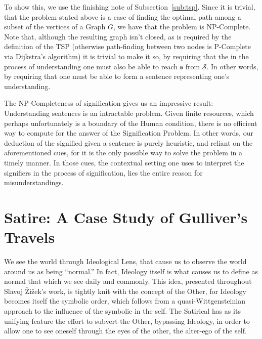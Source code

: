 \documentclass[11pt,letterpaper]{article}
\theoremstyle{definition}
\begin{document}
To show this, we use the finishing note of Subsection~\ref{sub:tsp}. Since it is trivial, that the problem stated above is a case of finding the optimal path among a subset of the vertices of a Graph \(G\), we have that the problem is NP-Complete.
Note that, although the resulting graph isn't closed, as is required by the definition of the TSP (otherwise path-finding between two nodes is P-Complete via Dijkstra's algorithm) it is trivial to make it so, by requiring that the in the process of understanding one must also be able to reach \(\mathfrak{s}\) from \(\mathscr{S}\). In other words, by requiring that one must be able to form a sentence representing one's understanding.

The NP-Completeness of signification gives us an impressive result: Understanding sentences is an intractable problem. Given finite resources, which perhaps unfortunately is a boundary of the Human condition, there is no efficient way to compute for the answer of the Signification Problem. In other words, our deduction of the signified given a sentence is purely heuristic, and reliant on the aforementioned cues, for it is the only possible way to solve the problem in a timely manner. In those cues, the contextual setting one uses to interpret the signifiers in the process of signification, lies the entire reason for misunderstandings.

\section{Satire: A Case Study of Gulliver's Travels}
We see the world through Ideological Lens, that cause us to observe the world around us as being ``normal.'' In fact, Ideology itself is what causes us to define as normal that which we see daily and commonly. This idea, presented throughout Slavoj Žižek's work,\autocite{zizek_2012} is tightly knit with the concept of the Other, for Ideology becomes itself the symbolic order, which follows from a quasi-Wittgensteinian approach to the influence of the symbolic in the self. The Satirical has as its unifying feature the effort to subvert the Other, bypassing Ideology, in order to allow one to see oneself through the eyes of the other, the alter-ego of the self.
\end{document}
